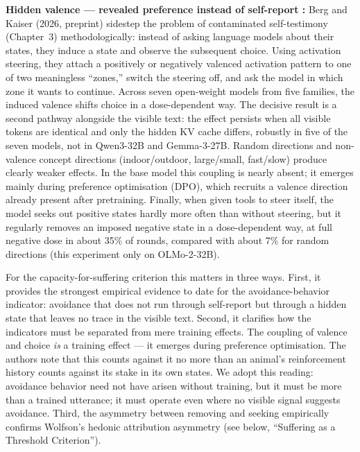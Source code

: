 \documentclass[acmlarge, nonacm]{acmart}
\begin{document}
\textbf{Hidden valence --- revealed preference instead of self-report \cite{bergkaiser2026}:} Berg and Kaiser (2026, preprint) sidestep the problem of contaminated self-testimony (Chapter~3) methodologically: instead of asking language models about their states, they induce a state and observe the subsequent choice. Using activation steering, they attach a positively or negatively valenced activation pattern to one of two meaningless ``zones,'' switch the steering off, and ask the model in which zone it wants to continue. Across seven open-weight models from five families, the induced valence shifts choice in a dose-dependent way. The decisive result is a second pathway alongside the visible text: the effect persists when all visible tokens are identical and only the hidden KV cache differs, robustly in five of the seven models, not in Qwen3-32B and Gemma-3-27B. Random directions and non-valence concept directions (indoor/outdoor, large/small, fast/slow) produce clearly weaker effects. In the base model this coupling is nearly absent; it emerges mainly during preference optimisation (DPO), which recruits a valence direction already present after pretraining. Finally, when given tools to steer itself, the model seeks out positive states hardly more often than without steering, but it regularly removes an imposed negative state in a dose-dependent way, at full negative dose in about 35\% of rounds, compared with about 7\% for random directions (this experiment only on OLMo-2-32B).

For the capacity-for-suffering criterion this matters in three ways. First, it provides the strongest empirical evidence to date for the avoidance-behavior indicator: avoidance that does not run through self-report but through a hidden state that leaves no trace in the visible text. Second, it clarifies how the indicators must be separated from mere training effects. The coupling of valence and choice \textit{is} a training effect --- it emerges during preference optimisation. The authors note that this counts against it no more than an animal's reinforcement history counts against its stake in its own states. We adopt this reading: avoidance behavior need not have arisen without training, but it must be more than a trained utterance; it must operate even where no visible signal suggests avoidance. Third, the asymmetry between removing and seeking empirically confirms Wolfson's hedonic attribution asymmetry (see below, ``Suffering as a Threshold Criterion'').
\end{document}
